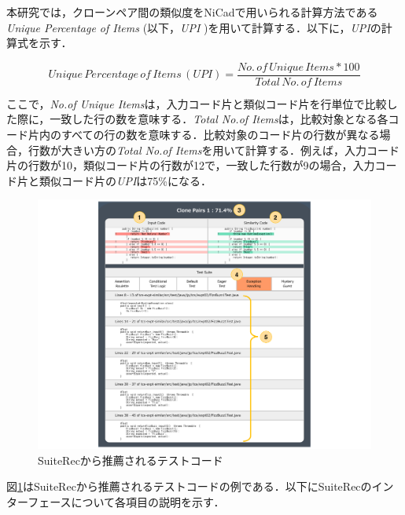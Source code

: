 \documentclass[12pt]{jarticle} %
\begin{document}
本研究では，クローンペア間の類似度を{\sf NiCad}で用いられる計算方法である{\it Unique Percentage of Items} (以下，{\it UPI} )を用いて計算する．以下に，{\it UPI}の計算式を示す．

\[
Unique\, Percentage\, of\, Items\, (UPI) =
\frac{No.\, of\, Unique\, Items * 100}{Total\, No.\, of\, Items}
\]

\vspace{\baselineskip}

ここで，{\it No.of Unique Items}は，入力コード片と類似コード片を行単位で比較した際に，一致した行の数を意味する．{\it Total No.of Items}は，比較対象となる各コード片内のすべての行の数を意味する．比較対象のコード片の行数が異なる場合，行数が大きい方の{\it Total No.of Items}を用いて計算する．例えば，入力コード片の行数が10，類似コード片の行数が12で，一致した行数が9の場合，入力コード片と類似コード片の{\it UPI}は75\%になる．

\begin{figure}[htbp]
\begin{center}
\includegraphics[clip,width=15cm]{image/SuiteRec.pdf}
\caption{{\sf SuiteRec}から推薦されるテストコード}
\label{SR}
\end{center}
\end{figure}

\newpage
図\ref{SR}は{\sf SuiteRec}から推薦されるテストコードの例である．以下に{\sf SuiteRec}のインターフェースについて各項目の説明を示す．
\end{document}
